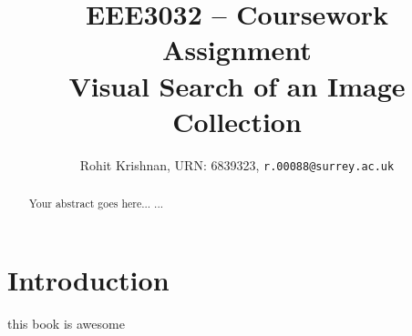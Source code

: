 \documentclass[10pt,a4paper,onecolumn]{article} %
\begin{document}
\title{EEE3032 – Coursework Assignment \\ Visual Search of an Image Collection }

\author{Rohit Krishnan, {URN: 6839323},
{\tt r.00088@surrey.ac.uk}
}
\maketitle

\newpage

\begin{abstract}
Your abstract goes here...
...
\end{abstract}

{
  \hypersetup{linkcolor=black}
  \tableofcontents
}

\twocolumn

\section{Introduction}
\label{sec:intro}

this book is awesome \cite{szeliski2011computer}

\newpage

{\small


}
\end{document}
